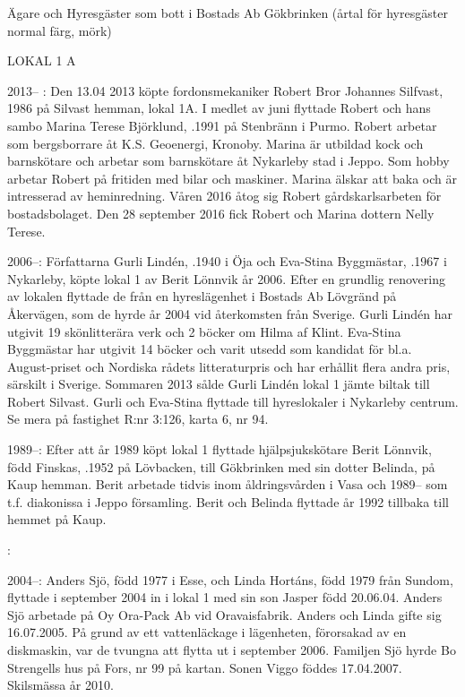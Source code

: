 Ägare och Hyresgäster som bott i Bostads Ab Gökbrinken (årtal för hyresgäster normal färg,  mörk)


LOKAL 1 A

 2013-- :
Den 13.04 2013 köpte fordonsmekaniker Robert Bror Johannes Silfvast,  1986 på Silvast hemman, lokal 1A. I medlet av juni flyttade Robert och hans sambo Marina Terese Björklund, .1991 på Stenbränn i Purmo. Robert arbetar som bergsborrare åt K.S. Geoenergi, Kronoby. Marina är utbildad kock och barnskötare och arbetar som barnskötare åt Nykarleby stad i Jeppo. Som hobby arbetar Robert på fritiden med bilar och maskiner. Marina älskar att baka och är intresserad av heminredning. Våren 2016 åtog sig Robert gårdskarlsarbeten för bostadsbolaget. Den 28 september 2016 fick Robert och Marina dottern Nelly Terese.

	2006--:
Författarna Gurli Lindén, .1940 i Öja och Eva-Stina Byggmästar, .1967 i Nykarleby, köpte lokal 1 av Berit Lönnvik år 2006. Efter en grundlig renovering av lokalen flyttade de från en hyreslägenhet i Bostads Ab Lövgränd på Åkervägen, som de hyrde år 2004 vid återkomsten från Sverige. Gurli Lindén har utgivit 19 skönlitterära verk och 2 böcker om Hilma af Klint. Eva-Stina Byggmästar har utgivit 14 böcker och varit utsedd som kandidat för bl.a. August-priset och Nordiska rådets litteraturpris och har erhållit flera andra pris, särskilt i Sverige. Sommaren 2013 sålde Gurli Lindén lokal 1 jämte biltak till Robert Silvast. Gurli och Eva-Stina flyttade till  hyreslokaler i Nykarleby centrum. Se mera på fastighet R:nr 3:126, karta 6, nr 94.

 1989--:
Efter att år 1989 köpt lokal 1 flyttade hjälpsjukskötare Berit Lönnvik, född Finskas, .1952 på Lövbacken, till Gökbrinken med sin dotter Belinda,  på Kaup hemman. Berit arbetade tidvis inom  åldringsvården i Vasa och 1989-- som t.f. diakonissa i Jeppo församling. Berit och Belinda flyttade år 1992 tillbaka till hemmet på Kaup.

:

2004--: Anders Sjö, född 1977 i Esse, och Linda Hortáns, född 1979 från Sundom, flyttade i september 2004 in i lokal 1 med sin son Jasper född 20.06.04. Anders Sjö arbetade på Oy Ora-Pack Ab vid Oravaisfabrik. Anders och Linda	gifte sig 16.07.2005. På grund av ett vattenläckage i lägenheten, förorsakad av en diskmaskin, var de tvungna	att flytta ut i september 2006. Familjen Sjö hyrde Bo	Strengells hus på Fors, nr 99 på kartan. Sonen Viggo föddes 17.04.2007. Skilsmässa år 2010.

